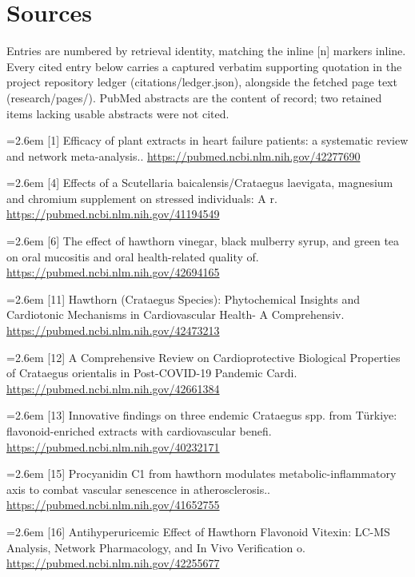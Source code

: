 \documentclass[11pt]{article}
\begin{document}
\section*{Sources}
\footnotesize Entries are numbered by retrieval identity, matching the inline [n] markers inline. Every cited entry below carries a captured verbatim supporting quotation in the project repository ledger (citations/ledger.json), alongside the fetched page text (research/pages/). PubMed abstracts are the content of record; two retained items lacking usable abstracts were not cited.
{\footnotesize
\noindent\hangindent=2.6em [1] Efficacy of plant extracts in heart failure patients: a systematic review and network meta-analysis.. \url{https://pubmed.ncbi.nlm.nih.gov/42277690}\par
\noindent\hangindent=2.6em [4] Effects of a Scutellaria baicalensis/Crataegus laevigata, magnesium and chromium supplement on stressed individuals: A r. \url{https://pubmed.ncbi.nlm.nih.gov/41194549}\par
\noindent\hangindent=2.6em [6] The effect of hawthorn vinegar, black mulberry syrup, and green tea on oral mucositis and oral health-related quality of. \url{https://pubmed.ncbi.nlm.nih.gov/42694165}\par
\noindent\hangindent=2.6em [11] Hawthorn (Crataegus Species): Phytochemical Insights and Cardiotonic Mechanisms in Cardiovascular Health- A Comprehensiv. \url{https://pubmed.ncbi.nlm.nih.gov/42473213}\par
\noindent\hangindent=2.6em [12] A Comprehensive Review on Cardioprotective Biological Properties of Crataegus orientalis in Post-COVID-19 Pandemic Cardi. \url{https://pubmed.ncbi.nlm.nih.gov/42661384}\par
\noindent\hangindent=2.6em [13] Innovative findings on three endemic Crataegus spp. from T{\"u}rkiye: flavonoid-enriched extracts with cardiovascular benefi. \url{https://pubmed.ncbi.nlm.nih.gov/40232171}\par
\noindent\hangindent=2.6em [15] Procyanidin C1 from hawthorn modulates metabolic-inflammatory axis to combat vascular senescence in atherosclerosis.. \url{https://pubmed.ncbi.nlm.nih.gov/41652755}\par
\noindent\hangindent=2.6em [16] Antihyperuricemic Effect of Hawthorn Flavonoid Vitexin: LC-MS Analysis, Network Pharmacology, and In Vivo Verification o. \url{https://pubmed.ncbi.nlm.nih.gov/42255677}\par
}
\end{document}
